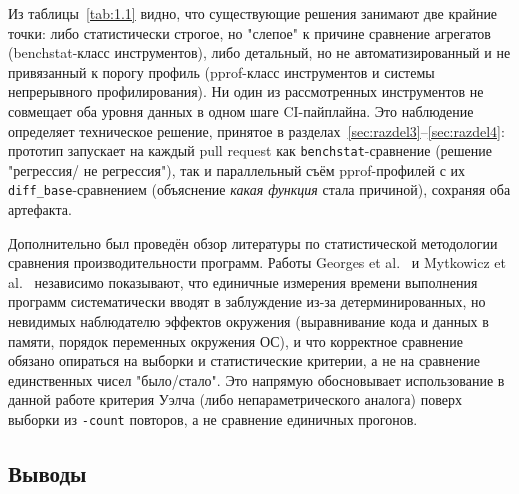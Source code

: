\documentclass[12pt,a4paper]{article}
\numberwithin{equation}{section}
\begin{document}
Из таблицы~\ref{tab:1.1} видно, что существующие решения занимают две
крайние точки: либо статистически строгое, но "слепое" к причине сравнение
агрегатов (benchstat-класс инструментов), либо детальный, но не
автоматизированный и не привязанный к порогу профиль (pprof-класс
инструментов и системы непрерывного профилирования). Ни один из
рассмотренных инструментов не совмещает оба уровня данных в одном шаге
CI-пайплайна. Это наблюдение определяет техническое решение,
принятое в разделах~\ref{sec:razdel3}--\ref{sec:razdel4}: прототип запускает
на каждый pull request как \texttt{benchstat}-сравнение (решение "регрессия/
не регрессия"), так и параллельный съём pprof-профилей с их
\texttt{diff\_base}-сравнением (объяснение \emph{какая функция} стала
причиной), сохраняя оба артефакта.

Дополнительно был проведён обзор литературы по статистической методологии
сравнения производительности программ. Работы Georges et al.~\cite{georges2007}
и Mytkowicz et al.~\cite{mytkowicz2009} независимо показывают, что
единичные измерения времени выполнения программ систематически вводят в
заблуждение из-за детерминированных, но невидимых наблюдателю эффектов
окружения (выравнивание кода и данных в памяти, порядок переменных
окружения ОС), и что корректное сравнение обязано опираться на выборки
и статистические критерии, а не на сравнение единственных чисел "было/стало".
Это напрямую обосновывает использование в данной работе критерия Уэлча
(либо непараметрического аналога) поверх выборки из \texttt{-count} повторов,
а не сравнение единичных прогонов.

\subsection{Выводы}
\end{document}

